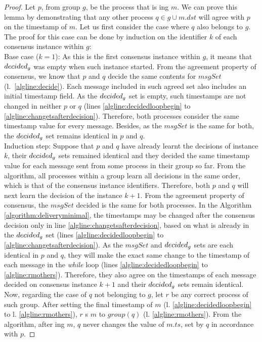 \documentclass[times, 10pt]{article}
\begin{document}
\begin{proof}
Let $p$, from group $g$, be the process that is \amcast{}ing $m$. We can prove this lemma by demonstrating that any other process $q \in g \cup m.dst$ will agree with $p$ on the timestamp of $m$. Let us first consider the case where $q$ also belongs to $g$. The proof for this case can be done by induction on the identifier $k$ of each consensus instance within $g$:\\

\noindent Base case ($k=1$): As this is the first consensus instance within $g$, it means that $decided\text{$_g$}$ was empty when such instance started. From the agreement property of consensus, we know that $p$ and $q$ decide the same contents for $msgSet$ \mbox{(l. \ref{algline:decide})}. Each message included in such agreed set also includes an initial timestamp field. As the $decided\text{$_g$}$ set is empty, such timestamps are not changed in neither $p$ or $q$ (lines \ref{algline:decidedloopbegin} to \ref{algline:changetsafterdecision}). Therefore, both processes consider the same timestamp value for every message. Besides, as the $msgSet$ is the same for both, the $decided\text{$_g$}$ set remains identical in $p$ and $q$.\\

\noindent Induction step: Suppose that $p$ and $q$ have already learnt the decisions of instance $k$, their $decided\text{$_g$}$ sets remained identical and they decided the same timestamp value for each message sent from some process in their group so far. From the algorithm, all processes within a group learn all decisions in the same order, which is that of the consensus instance identifiers. Therefore, both $p$ and $q$ will next learn the decision of the instance $k+1$. From the agreement property of consensus, the $msgSet$ decided is the same for both processes. In the Algorithm \ref{algorithm:deliveryminimal}, the timestamps may be changed after the consensus decision only in line \ref{algline:changetsafterdecision}, based on what is already in the $decided\text{$_g$}$ set (lines \ref{algline:decidedloopbegin} to \ref{algline:changetsafterdecision}). As the $msgSet$ and $decided\text{$_g$}$ sets are each identical in $p$ and $q$, they will make the exact same change to the timestamp of each message in the \textit{while} loop (lines \ref{algline:decidedloopbegin} to \ref{algline:rmothers}). Therefore, they also agree on the timestamps of each message decided on consensus instance $k+1$ and their $decided\text{$_g$}$ sets remain identical.\\

Now, regarding the case of $q$ not belonging to $g$, let $r$ be any correct process of such group. After setting the final timestamp of $m$ (l. \ref{algline:decidedloopbegin} to l. \ref{algline:rmothers}), $r$ \rmcast{}s $m$ to $group(q)$ (l. \ref{algline:rmothers}). From the algorithm, after \rmdel{}ing $m$, $q$ never changes the value of $m.ts$, set by $q$ in accordance with $p$.%
\end{proof}
\end{document}
